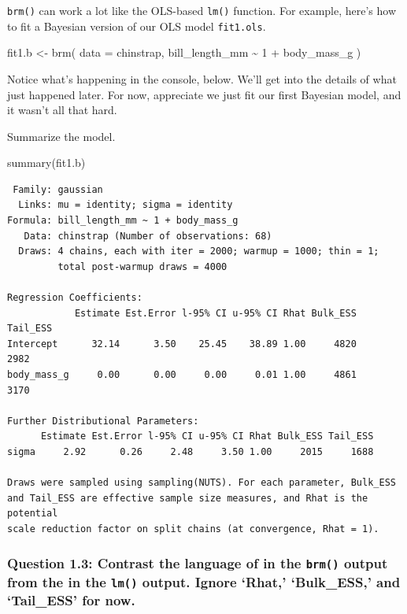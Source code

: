 \documentclass[
  letterpaper,
  DIV=11,
  numbers=noendperiod]{scrartcl}
\newenvironment{Shaded}{\begin{snugshade}}{\end{snugshade}}
\newcommand{\AttributeTok}[1]{\textcolor[rgb]{0.40,0.45,0.13}{#1}}
\newcommand{\DecValTok}[1]{\textcolor[rgb]{0.68,0.00,0.00}{#1}}
\newcommand{\FunctionTok}[1]{\textcolor[rgb]{0.28,0.35,0.67}{#1}}
\newcommand{\NormalTok}[1]{\textcolor[rgb]{0.00,0.23,0.31}{#1}}
\newcommand{\OtherTok}[1]{\textcolor[rgb]{0.00,0.23,0.31}{#1}}
\newcommand{\SpecialCharTok}[1]{\textcolor[rgb]{0.37,0.37,0.37}{#1}}
\begin{document}
\texttt{brm()} can work a lot like the OLS-based \texttt{lm()} function.
For example, here's how to fit a Bayesian version of our OLS model
\texttt{fit1.ols}.

\begin{Shaded}
\begin{Highlighting}[]
\NormalTok{fit1.b }\OtherTok{\textless{}{-}} \FunctionTok{brm}\NormalTok{(}
  \AttributeTok{data =}\NormalTok{ chinstrap,}
\NormalTok{  bill\_length\_mm }\SpecialCharTok{\textasciitilde{}} \DecValTok{1} \SpecialCharTok{+}\NormalTok{ body\_mass\_g}
\NormalTok{)}
\end{Highlighting}
\end{Shaded}

Notice what's happening in the console, below. We'll get into the
details of what just happened later. For now, appreciate we just fit our
first Bayesian model, and it wasn't all that hard.

Summarize the model.

\begin{Shaded}
\begin{Highlighting}[]
\FunctionTok{summary}\NormalTok{(fit1.b)}
\end{Highlighting}
\end{Shaded}

\begin{verbatim}
 Family: gaussian 
  Links: mu = identity; sigma = identity 
Formula: bill_length_mm ~ 1 + body_mass_g 
   Data: chinstrap (Number of observations: 68) 
  Draws: 4 chains, each with iter = 2000; warmup = 1000; thin = 1;
         total post-warmup draws = 4000

Regression Coefficients:
            Estimate Est.Error l-95% CI u-95% CI Rhat Bulk_ESS Tail_ESS
Intercept      32.14      3.50    25.45    38.89 1.00     4820     2982
body_mass_g     0.00      0.00     0.00     0.01 1.00     4861     3170

Further Distributional Parameters:
      Estimate Est.Error l-95% CI u-95% CI Rhat Bulk_ESS Tail_ESS
sigma     2.92      0.26     2.48     3.50 1.00     2015     1688

Draws were sampled using sampling(NUTS). For each parameter, Bulk_ESS
and Tail_ESS are effective sample size measures, and Rhat is the potential
scale reduction factor on split chains (at convergence, Rhat = 1).
\end{verbatim}

\subsubsection{\texorpdfstring{Question 1.3: Contrast the language of in
the \texttt{brm()} output from the in the \texttt{lm()} output. Ignore
`Rhat,' `Bulk\_ESS,' and `Tail\_ESS' for
now.}{Question 1.3: Contrast the language of in the brm() output from the in the lm() output. Ignore `Rhat,' `Bulk\_ESS,' and `Tail\_ESS' for now.}}\label{question-1.3-contrast-the-language-of-in-the-brm-output-from-the-in-the-lm-output.-ignore-rhat-bulk_ess-and-tail_ess-for-now.}
\end{document}
